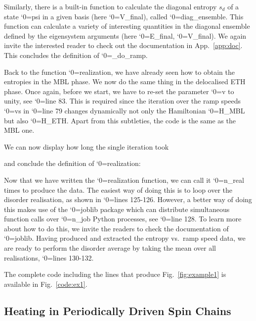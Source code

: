 \documentclass{SciPost}
\newcommand\0{\scalebox{-1}[1]{0}}
\let\svttfamily\ttfamily
\renewcommand\ttfamily{\svttfamily\catcode`0=\active }
\renewcommand\texttt{\bgroup\ttfamily\texttthelp}
\def\texttthelp#1{#1\egroup}
\begin{document}
 
%
Similarly, there is a built-in function to calculate the diagonal entropy $s_d$ of a state \texttt{psi} in a given basis (here \texttt{V\_final}), called \texttt{diag\_ensemble}. This function can calculate a variety of interesting quantities in the diagonal ensemble defined by the eigensystem arguments (here \texttt{E\_final}, \texttt{V\_final}). We again invite the interested reader to check out the documentation in App.~\ref{app:doc}. This concludes the definition of \texttt{\_do\_ramp}.

% 
Back to the function \texttt{realization}, we have already seen how to obtain the entropies in the MBL phase. We now do the same thing in the delocalised ETH phase. Once again, before we start, we have to re-set the parameter \texttt{v} to unity, see \texttt{line 83}. This is required since the iteration over the ramp speeds \texttt{vs} in \texttt{line 79} changes dynamically not only the Hamiltonian \texttt{H\_MBL} but also \texttt{H\_ETH}. Apart from this subtleties, the code is the same as the MBL one.

% 
We can now display how long the single iteration took

%
and conclude the definition of \texttt{realization}:

%
Now that we have written the \texttt{realization} function, we can call it \texttt{n\_real} times to produce the data. The easiest way of doing this is to loop over the disorder realisation, as shown in \texttt{lines 125-126}. However, a better way of doing this makes use of the \texttt{joblib} package which can distribute simultaneous function calls over \texttt{n\_job} Python processes, see \texttt{line 128}. To learn more about how to do this, we invite the readers to check the documentation of \texttt{joblib}. Having produced and extracted the entropy vs.~ramp speed data, we are ready to perform the disorder average by taking the mean over all realisations, \texttt{lines 130-132}. 

%
The complete code including the lines that produce Fig.~\ref{fig:example1} is available in Fig.~\ref{code:ex1}.


\subsection{Heating in Periodically Driven Spin Chains}
\label{subsec:Floquet} 
\end{document}
